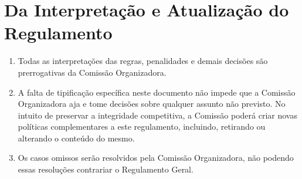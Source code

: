 \section*{Da Interpretação e Atualização do Regulamento}

\begin{enumerate}[start=1,label={\bfseries Art. \arabic*$^\circ$ - }, resume]
    \item Todas as interpretações das regras, penalidades e demais decisões são prerrogativas
    da Comissão Organizadora.
    \item A falta de tipificação específica neste documento não impede que a
        Comissão Organizadora aja e tome decisões sobre qualquer assunto não previsto.
        No intuito de preservar a integridade competitiva, a Comissão poderá criar
        novas políticas complementares a este regulamento, incluindo, retirando ou
        alterando o conteúdo do mesmo.
    \item Os casos omissos serão resolvidos pela Comissão Organizadora, não
        podendo essas resoluções contrariar o Regulamento Geral.
\end{enumerate}
